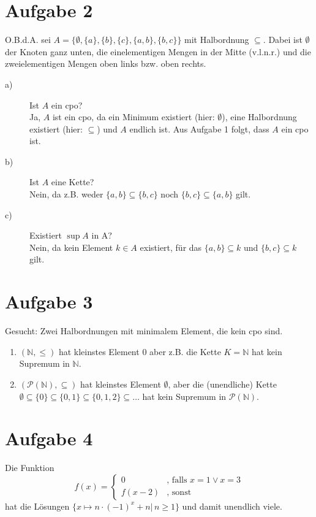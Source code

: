 \documentclass[11pt,a4paper,ngerman]{article}
\begin{document}
\section*{Aufgabe 2}
O.B.d.A. sei $A = \{ \emptyset, \{ a \}, \{ b \}, \{ c \}, \{ a,b \}, \{ b,c \} \}$ mit Halbordnung $\subseteq$. Dabei ist $\emptyset$ der Knoten ganz unten, die einelementigen Mengen in der Mitte (v.l.n.r.) und die zweielementigen Mengen oben links bzw. oben rechts.

\begin{description}
\item[a)] Ist $A$ ein cpo? \\
Ja, $A$ ist ein cpo, da ein Minimum existiert (hier: $\emptyset$), eine Halbordnung existiert (hier: $\subseteq$) und $A$ endlich ist. Aus Aufgabe 1 folgt, dass $A$ ein cpo ist.
\item[b)] Ist $A$ eine Kette?\\
Nein, da z.B. weder $\{ a,b \} \subseteq \{ b,c \}$ noch $\{ b,c \} \subseteq \{ a,b \}$ gilt.
\item[c)] Existiert $\sup A$ in A?\\
Nein, da kein Element $k \in A$ existiert, für das $\{ a,b \} \subseteq k$ und $\{ b,c \} \subseteq k$ gilt.
\end{description}


\section*{Aufgabe 3}
Gesucht: Zwei Halbordnungen mit minimalem Element, die kein cpo sind.

\begin{enumerate}
\item $(\mathbb{N}, \leq)$ hat kleinstes Element $0$ aber z.B. die Kette $K = \mathbb{N}$ hat kein Supremum in $\mathbb{N}$.
\item $(\mathcal{P}(\mathbb{N}), \subseteq)$ hat kleinstes Element $\emptyset$, aber die (unendliche) Kette $\emptyset \subseteq \{0\} \subseteq \{0,1\} \subseteq \{0,1,2\} \subseteq \ldots$ hat kein Supremum in $\mathcal{P}(\mathbb{N})$.
\end{enumerate}


\section*{Aufgabe 4}
Die Funktion
$$ f(x) = \begin{cases}0 & \text{, falls } x = 1 \lor x = 3\\
                       f(x-2) & \text{, sonst} \end{cases}$$
hat die Lösungen $\{ x \mapsto n \cdot (-1)^x + n | \, n \geq 1 \}$ und damit unendlich viele.

\label{LastPage}
\end{document}
